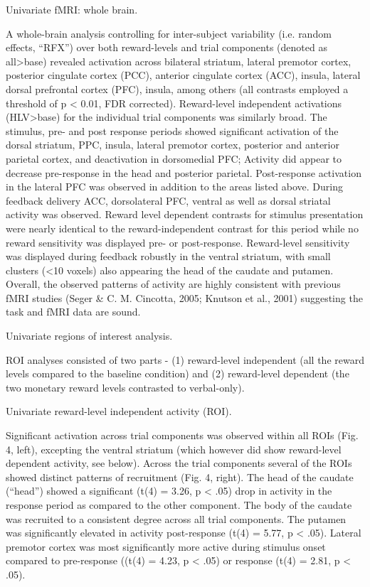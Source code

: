 Univariate fMRI: whole brain.  

A whole-brain analysis controlling for inter-subject variability (i.e. random effects, “RFX”) over both reward-levels and trial components (denoted as all>base) revealed activation across  bilateral striatum, lateral premotor cortex, posterior cingulate cortex (PCC), anterior cingulate cortex (ACC), insula, lateral dorsal prefrontal cortex (PFC), insula, among others (all contrasts employed a threshold of p < 0.01, FDR corrected).  Reward-level independent activations (HLV>base) for the individual trial components was similarly broad.  The stimulus, pre- and post response periods showed significant activation of the dorsal striatum, PPC, insula, lateral premotor cortex, posterior and anterior parietal cortex, and deactivation in dorsomedial PFC; Activity did appear to decrease pre-response in the head and posterior parietal.  Post-response activation in the lateral PFC was observed in addition to the  areas listed above.  During feedback delivery ACC, dorsolateral PFC, ventral as well as dorsal striatal activity was observed. Reward level dependent contrasts for stimulus presentation were nearly identical to the reward-independent contrast for this period while no reward sensitivity was displayed pre- or post-response.   Reward-level sensitivity was displayed during feedback robustly in the ventral striatum, with small clusters (<10 voxels) also appearing the head of the caudate and putamen.  Overall, the observed patterns of activity are highly consistent with previous fMRI studies (Seger & C. M. Cincotta, 2005; Knutson et al., 2001) suggesting the task and fMRI data are sound.



Univariate regions of interest analysis.  

ROI analyses consisted of two parts - (1) reward-level independent (all the reward levels compared to the baseline condition) and (2) reward-level dependent (the two monetary reward levels contrasted to verbal-only).



Univariate reward-level independent activity (ROI).  

Significant activation across trial components was observed within all ROIs (Fig. 4, left), excepting the ventral striatum (which however did show reward-level dependent activity, see below).  Across the trial components several of the ROIs showed distinct patterns of recruitment (Fig. 4, right).  The head of the caudate (“head”) showed a significant (t(4) = 3.26, p < .05) drop in activity in the response period as compared to the other component.  The body of the caudate was recruited to a consistent degree across all trial components.  The putamen was significantly elevated in activity post-response (t(4) = 5.77, p < .05).  Lateral premotor cortex was most significantly more active during stimulus onset compared to pre-response ((t(4) = 4.23, p < .05) or response (t(4) = 2.81, p < .05).  

